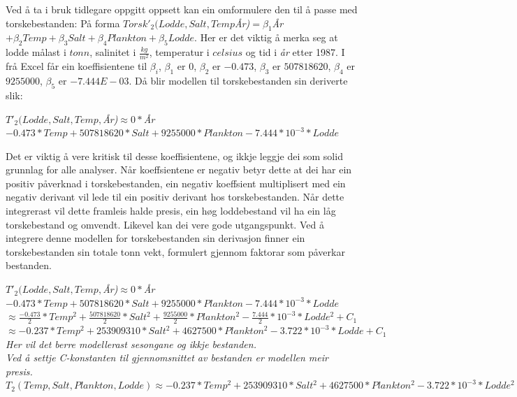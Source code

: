 \documentclass{report}
\begin{document}
Ved å ta i bruk tidlegare oppgitt oppsett kan ein omformulere den til å passe med torskebestanden: \newline
På forma $Torsk'_{2}(Lodde,Salt,Temp$\textit{År)}$=\beta_1$\textit{År}$ +\beta_2 Temp+ \beta_3 Salt + \beta_4 Plankton+\beta_5 Lodde$.
Her er det viktig å merka seg at lodde målast i $tonn$, salinitet i $\frac{kg}{m^2}$, temperatur i $celsius$ og tid i \textit{år} etter 1987.
I frå Excel får ein koeffisientene til $\beta_i$, $\beta_1$ er $0$, $\beta_2$ er $-0.473$, $\beta_3$ er $507818620$, $\beta_4$ er $9255000$, $\beta_5$ er $-7.444E-03$.
Då blir modellen til torskebestanden sin deriverte slik:
\begin{center}
	$T'_{2}(Lodde,Salt,Temp,$\textit{År)}$ \approx 0*$\textit{År}$ -0.473*Temp + 507818620*Salt + 9255000*Plankton - 7.444*10^{-3}*Lodde$
\end{center}
Det er viktig å vere kritisk til desse koeffisientene, og ikkje leggje dei som solid grunnlag for alle analyser.
Når koeffsientene er negativ betyr dette at dei har ein positiv påverknad i torskebestanden, ein negativ koeffsient multiplisert med ein negativ derivant vil lede til ein positiv derivant hos torskebestanden.
Når dette integrerast vil dette framleis halde presis, ein høg loddebestand vil ha ein låg torskebestand og omvendt.
Likevel kan dei vere gode utgangspunkt. Ved å integrere denne modellen for torskebestanden sin derivasjon finner ein torskebestanden sin totale tonn vekt, formulert gjennom faktorar som påverkar bestanden.

\begin{center}
	$T'_{2}(Lodde,Salt,Temp,$\textit{År)}$ \approx 0*$\textit{År}$-0.473*Temp + 507818620*Salt + 9255000*Plankton - 7.444*10^{-3}*Lodde $\\
	$\approx \frac{-0.473}{2}*Temp^2 + \frac{507818620}{2}*Salt^2 + \frac{9255000}{2}*Plankton^2  -\frac{7.444}{2}*10^{-3}*Lodde^2 + C_1$\\
	$\approx -0.237*Temp^2 + 253909310*Salt^2 + 4627500*Plankton^2 -3.722*10^{-3}*Lodde + C_1$\\
	\textit{Her vil det berre modellerast sesongane og ikkje bestanden.}\\
	\textit{Ved å settje C-konstanten til gjennomsnittet av bestanden er modellen meir presis.}\\
	$T_{2}(Temp,Salt,Plankton,Lodde) \approx -0.237*Temp^2 + 253909310*Salt^2 + 4627500*Plankton^2 -3.722*10^{-3}*Lodde^2 + 531481$
\end{center}
\end{document}
